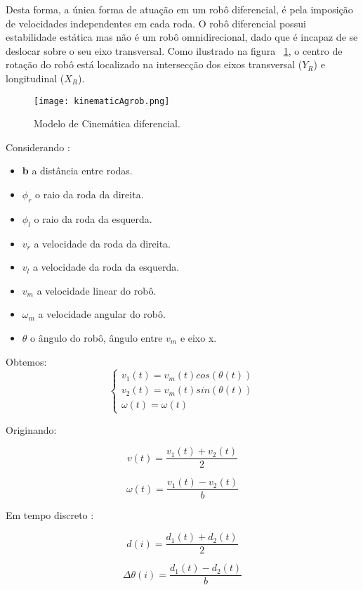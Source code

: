 Desta forma, a única forma de atuação em um robô diferencial, é pela imposição de velocidades independentes em cada roda. O robô diferencial possui estabilidade estática mas não é um robô omnidirecional, dado que é incapaz de se deslocar sobre o seu eixo transversal. Como ilustrado na figura ~\ref{fig:kinematicAgrob}, o centro de rotação do robô está localizado na intersecção dos eixos transversal (\textbf{$Y_R$}) e longitudinal (\textbf{$X_R$}).

\begin{figure}[h!] %
	\begin{center}
		\leavevmode		
		\texttt{[image: kinematicAgrob.png]}
		\caption{Modelo de Cinemática diferencial.}
		\label{fig:kinematicAgrob}
	\end{center}
\end{figure}


Considerando : 
\begin{itemize}
	\item \textbf{b} a distância entre rodas.
	\item \textbf{$\phi_r$} o raio da roda da direita.
	\item \textbf{$\phi_l$} o raio da roda da esquerda.
	\item \textbf{$v_r$} a velocidade da roda da direita.
	\item \textbf{$v_l$} a velocidade da roda da esquerda.
	\item \textbf{$v_m$} a velocidade linear do robô.
	\item \textbf{$\omega_m$} a velocidade angular do robô.
	\item $\textbf{$\theta$}$ o ângulo do robô, ângulo entre $v_m$ e eixo x.
\end{itemize}

Obtemos:
\[ \left\{\begin{array}{ccc}
v_1(t) = v_m(t) cos( \theta(t))\\ 
v_2(t) = v_m(t) sin( \theta(t))\\ 
\omega(t) = \omega(t)
\end{array}\right. \]

Originando: 

\[ v(t) = \frac{v_1(t)+v_2(t)}{2} \]

\[  \omega(t) = \frac{v_1(t)-v_2(t)}{b} \]

Em tempo discreto :

\[ d(i) = \frac{d_1(t)+d_2(t)}{2} \]

\[ \Delta \theta (i) = \frac{d_1(t)-d_2(t)}{b} \]

